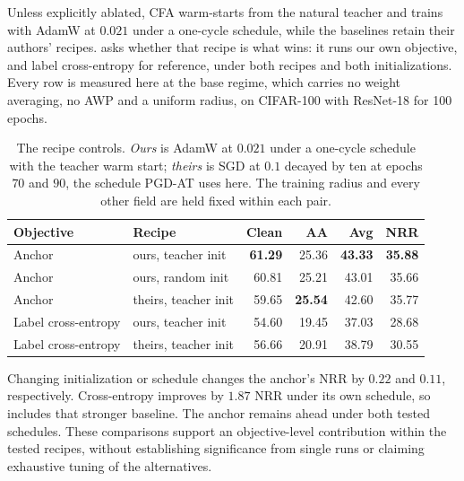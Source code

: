 Unless explicitly ablated, CFA warm-starts from the natural teacher and trains with AdamW at $0.021$
under a one-cycle schedule, while the baselines retain their authors' recipes.  asks
whether that recipe is what wins: it runs our own objective, and label cross-entropy for reference,
under both recipes and both initializations. Every row is measured here at the base regime, which
carries no weight averaging, no AWP and a uniform radius, on CIFAR-100 with ResNet-18 for 100 epochs.

\begin{table}[!htbp]
  \centering \small \setlength{\tabcolsep}{5pt}
  \caption{The recipe controls. \emph{Ours} is AdamW at $0.021$ under a one-cycle schedule with the
  teacher warm start; \emph{theirs} is SGD at $0.1$ decayed by ten at epochs $70$ and $90$, the
  schedule PGD-AT uses here. The training radius and every other field are held fixed within each
  pair.}
  \label{tab:recipe}
  \begin{tabular}{llrrrr}
    \toprule
    Objective & Recipe & Clean & AA & Avg & NRR \\
    \midrule
    Anchor              & ours, teacher init   & \textbf{61.29} & 25.36 & \textbf{43.33} & \textbf{35.88} \\
    Anchor              & ours, random init    & 60.81 & 25.21 & 43.01 & 35.66 \\
    Anchor              & theirs, teacher init & 59.65 & \textbf{25.54} & 42.60 & 35.77 \\
    \midrule
    Label cross-entropy & ours, teacher init   & 54.60 & 19.45 & 37.03 & 28.68 \\
    Label cross-entropy & theirs, teacher init & 56.66 & 20.91 & 38.79 & 30.55 \\
    \bottomrule
  \end{tabular}
\end{table}



Changing initialization or schedule changes the anchor's NRR by $0.22$ and $0.11$, respectively.
Cross-entropy improves by $1.87$ NRR under its own schedule, so  includes that
stronger baseline. The anchor remains ahead under both tested schedules. These comparisons support
an objective-level contribution within the tested recipes, without establishing significance from
single runs or claiming exhaustive tuning of the alternatives.

